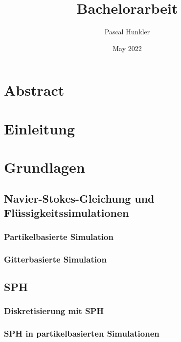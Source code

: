 \documentclass{scrreprt}
\title{Bachelorarbeit}
\author{Pascal Hunkler}
\date{May 2022}
\begin{document}
\maketitle

\setlength{\parindent}{0pt}
\setlength{\parskip}{1em}

\tableofcontents

\chapter{Abstract}
\chapter{Einleitung}
\chapter{Grundlagen}
\section{Navier-Stokes-Gleichung und Flüssigkeitssimulationen}
\subsection{Partikelbasierte Simulation}
\subsection{Gitterbasierte Simulation}
\section{SPH}
\subsection{Diskretisierung mit SPH}
\subsection{SPH in partikelbasierten Simulationen}
\end{document}
